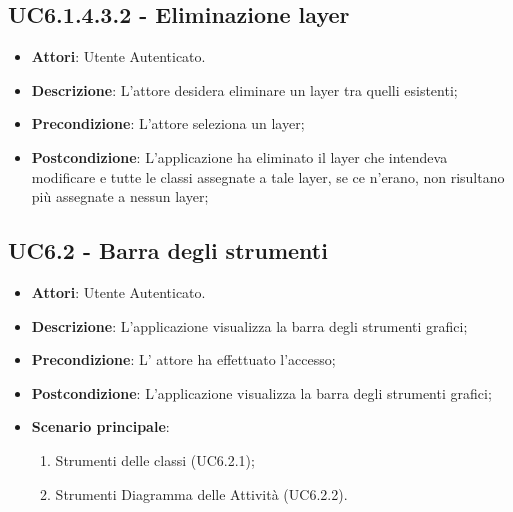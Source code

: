 \subsection{UC6.1.4.3.2 - Eliminazione layer} 
\label{ssec:UC6.1.4.3.2} 
\begin{itemize} 
\item \textbf{Attori}: Utente Autenticato.
\item \textbf{Descrizione}: L'attore desidera eliminare un layer tra quelli esistenti;
\item \textbf{Precondizione}: L'attore seleziona un layer;
\item \textbf{Postcondizione}: L'applicazione ha eliminato il layer che intendeva modificare e tutte le classi assegnate a tale layer, se ce n'erano, non risultano più assegnate a nessun layer;
\end{itemize} 
\subsection{UC6.2 - Barra degli strumenti} 
\label{ssec:UC6.2} 
\begin{itemize} 
\item \textbf{Attori}: Utente Autenticato.
\item \textbf{Descrizione}: L'applicazione visualizza la barra degli strumenti grafici;
\item \textbf{Precondizione}: L' attore ha effettuato l'accesso;
\item \textbf{Postcondizione}: L'applicazione visualizza la barra degli strumenti grafici;
\item \textbf{Scenario principale}: \begin{enumerate}\item Strumenti delle classi (UC6.2.1);\item Strumenti Diagramma delle Attività (UC6.2.2). 
 \end{enumerate}
\end{itemize} 
